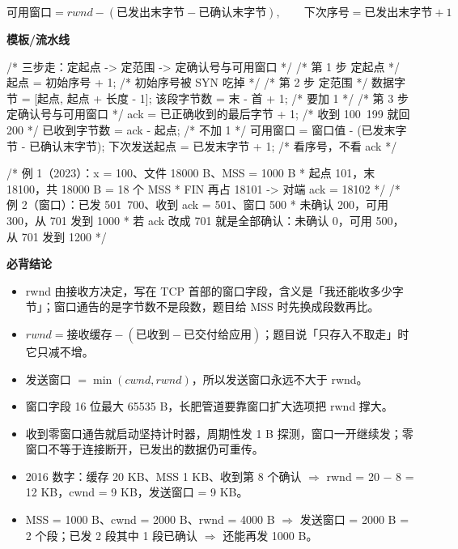 \documentclass[10pt,a4paper]{ctexart}
\begin{document}
\[
可用窗口=rwnd-(\text{已发出末字节}-\text{已确认末字节}),\qquad 下次序号=\text{已发出末字节}+1
\]

\textbf{模板/流水线}

\begin{codebox}
/* 三步走：定起点 -> 定范围 -> 定确认号与可用窗口 */
/* 第 1 步 定起点 */
起点 = 初始序号 + 1;                    /* 初始序号被 SYN 吃掉 */
/* 第 2 步 定范围 */
数据字节 = [起点, 起点 + 长度 - 1];
该段字节数 = 末 - 首 + 1;               /* 要加 1 */
/* 第 3 步 定确认号与可用窗口 */
ack = 已正确收到的最后字节 + 1;          /* 收到 100~199 就回 200 */
已收到字节数 = ack - 起点;               /* 不加 1 */
可用窗口 = 窗口值 - (已发末字节 - 已确认末字节);
下次发送起点 = 已发末字节 + 1;           /* 看序号，不看 ack */

/* 例 1（2023）：x = 100、文件 18000 B、MSS = 1000 B
 * 起点 101，末 18100，共 18000 B = 18 个 MSS
 * FIN 再占 18101 -> 对端 ack = 18102
 */
/* 例 2（窗口）：已发 501~700、收到 ack = 501、窗口 500
 * 未确认 200，可用 300，从 701 发到 1000
 * 若 ack 改成 701 就是全部确认：未确认 0，可用 500，从 701 发到 1200
 */
\end{codebox}




\textbf{必背结论}

\begin{itemize}

\item rwnd 由接收方决定，写在 TCP 首部的窗口字段，含义是「我还能收多少字节」；窗口通告的是字节数不是段数，题目给 MSS 时先换成段数再比。

\item $rwnd=\text{接收缓存}-(\text{已收到}-\text{已交付给应用})$；题目说「只存入不取走」时它只减不增。

\item 发送窗口 $=\min(cwnd,rwnd)$，所以发送窗口永远不大于 rwnd。

\item 窗口字段 16 位最大 65535 B，长肥管道要靠窗口扩大选项把 rwnd 撑大。

\item 收到零窗口通告就启动坚持计时器，周期性发 1 B 探测，窗口一开继续发；零窗口不等于连接断开，已发出的数据仍可重传。

\item 2016 数字：缓存 20 KB、MSS 1 KB、收到第 8 个确认 $\Rightarrow$ rwnd = 20 − 8 = 12 KB，cwnd = 9 KB，发送窗口 = 9 KB。

\item MSS = 1000 B、cwnd = 2000 B、rwnd = 4000 B $\Rightarrow$ 发送窗口 = 2000 B = 2 个段；已发 2 段其中 1 段已确认 $\Rightarrow$ 还能再发 1000 B。

\end{itemize}
\end{document}
